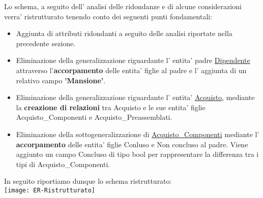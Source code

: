 Lo schema, a seguito dell' analisi delle ridondanze e di alcune considerazioni verra' ristrutturato tenendo conto dei seguenti punti fondamentali:
\begin{itemize}
\item Aggiunta di attributi ridondanti a seguito delle analisi riportate nella precedente sezione.
\item Eliminazione della generalizzazione riguardante l' entita' padre \underline{Dipendente} attraverso l'\textbf{accorpamento} delle entita' figlie al padre e l' aggiunta di un relativo campo \textbf{'Mansione'}.
\item Eliminazione della generalizzazione riguardante l' entita' \underline{Acquisto}, mediante la \textbf{creazione di relazioni} tra Acquisto e le sue entita' figlie Acquisto\_Componenti e Acquisto\_Preassemblati.
\item Eliminazione della sottogeneralizzazione di \underline{Acquisto\_Componenti} mediante l' \textbf{accorpamento} delle entita' figlie Conluso e Non concluso al padre. Viene aggiunto un campo Concluso di tipo bool per rappresentare la differenza tra i tipi di Acquisto\_Componenti.\\
\end{itemize}

In seguito riportiamo dunque lo schema ristrutturato:\\
\texttt{[image: ER-Ristrutturato]}